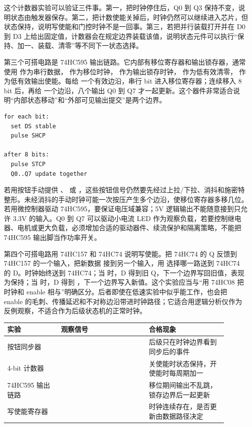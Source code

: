这个计数器实验可以验证三件事。第一，把时钟停住后，Q0 到 Q3 保持不变，说明状态由触发器保存。第二，把计数使能关掉后，时钟仍然可以继续进入芯片，但状态保持，说明写使能和门控时钟不是一回事。第三，若把并行装载打开并在 D0 到 D3 上给出固定值，计数器会在规定边界装载该值，说明状态元件可以执行“保持、加一、装载、清零”等不同下一状态选择。

第三个可搭电路是 74HC595 输出链路。它内部有移位寄存器和输出锁存器，通常使用  作为串行数据， 作为移位时钟， 作为输出锁存时钟， 作为低有效清零， 作为低有效输出使能。每给  一个有效边沿，串行 bit 进入移位寄存器；连续移入 8 bit 后，再给  一个边沿，八个输出 Q0 到 Q7 才一起更新。这个器件非常适合说明“内部状态移动”和“外部可见输出提交”是两个边界。

\begin{lstlisting}
for each bit:
  set DS stable
  pulse SHCP

after 8 bits:
  pulse STCP
  Q0..Q7 update together
\end{lstlisting}

若用按钮手动提供 、 或 ，这些按钮信号仍然要先经过上拉/下拉、消抖和施密特整形。未经消抖的手动时钟可能一次按压产生多个边沿，使移位寄存器多移几位。若用微控制器驱动 74HC595，要保证电压域兼容；5V 逻辑输出不能随意接到只允许 3.3V 的输入。Q0 到 Q7 可以驱动小电流 LED 作为观察负载，若要控制继电器、电机或更大负载，必须增加合适的驱动器件、续流保护和隔离策略，不能把 74HC595 输出脚当作功率开关。

第四个可搭电路用 74HC157 和 74HC74 说明写使能。把 74HC74 的 Q 反馈到 74HC157 的一个输入，把新数据  接到另一个输入，用  选择哪一路送到 74HC74 的 D。时钟始终送到 74HC74；当  时，D 得到旧 Q，下一个边界写回旧值，表现为保持；当  时，D 得到 ，下一个边界写入新值。这个实验应当与“用 74HC08 把时钟和 enable 相与”明确区分。后者即使在低速实验中似乎能工作，也会把 enable 的毛刺、传播延迟和不对称边沿带进时钟路径；它适合用逻辑分析仪作为反例观察，不适合作为后级状态机的正常时钟。

\begin{longtable}{L{0.22\linewidth}L{0.36\linewidth}L{0.32\linewidth}}
\toprule
实验 & 观察信号 & 合格现象 \\
\midrule
按钮同步器 &  & 后级只在时钟边界看到同步后的事件 \\
4-bit 计数器 &  & 关使能时状态保持，开使能时每周期加一 \\
74HC595 输出链路 &  & 移位期间输出不乱跳，锁存边界后一起更新 \\
写使能寄存器 &  & 时钟连续存在，是否更新由数据路径决定 \\
\bottomrule
\end{longtable}

